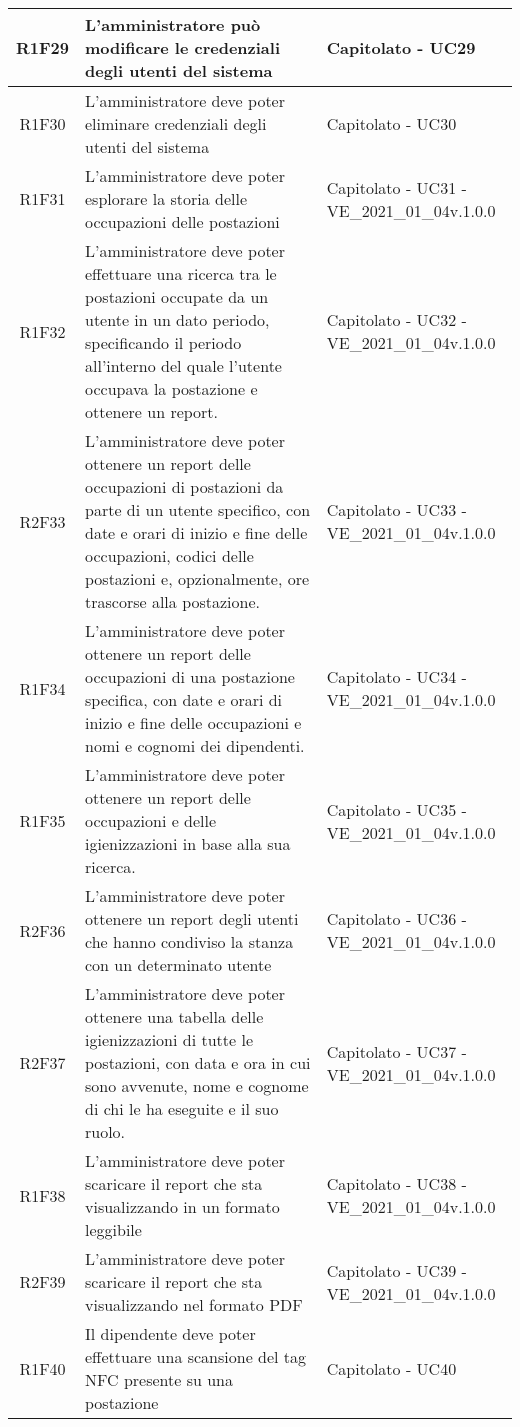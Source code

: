 \begin{center}
\begin{longtable}{|c|p{10cm}|p{4cm}|}
		\hline
		R1F29&L'amministratore può modificare le credenziali degli utenti del sistema	&Capitolato - UC29	\\
		\hline
		R1F30&L'amministratore deve poter eliminare credenziali degli utenti del sistema	& Capitolato - UC30	\\
		\hline	
		R1F31&L'amministratore deve poter esplorare la storia delle occupazioni delle postazioni	& Capitolato - UC31 - VE\_2021\_01\_04v.1.0.0	\\
		\hline
		R1F32&L'amministratore deve poter effettuare una ricerca tra le postazioni occupate da un utente in un dato periodo, specificando il periodo all'interno del quale l'utente occupava la postazione e ottenere un report. & 	Capitolato - UC32 - VE\_2021\_01\_04v.1.0.0\\
		\hline
		R2F33&L'amministratore deve poter ottenere un report delle occupazioni di postazioni da parte di un utente specifico, con date e orari di inizio e fine delle occupazioni,  codici delle postazioni e, opzionalmente, ore trascorse alla postazione. & 	Capitolato - UC33 - VE\_2021\_01\_04v.1.0.0\\
		\hline
		R1F34&L'amministratore deve poter ottenere un report delle occupazioni di una postazione specifica, con date e orari di inizio e fine delle occupazioni e nomi e cognomi dei dipendenti.	&Capitolato - UC34 - VE\_2021\_01\_04v.1.0.0	\\
		\hline
		R1F35&L'amministratore deve poter ottenere un report delle occupazioni e delle igienizzazioni in base alla sua ricerca.	&Capitolato - UC35 - VE\_2021\_01\_04v.1.0.0	\\
		\hline
		R2F36 & L'amministratore deve poter ottenere un report degli utenti che hanno condiviso la stanza con un determinato utente & Capitolato - UC36 - VE\_2021\_01\_04v.1.0.0\\
		\hline
		R2F37&L'amministratore deve poter ottenere una tabella delle igienizzazioni di tutte le postazioni, con data e ora in cui sono avvenute, nome e cognome di chi le ha eseguite e il suo ruolo.	&Capitolato - UC37 - VE\_2021\_01\_04v.1.0.0	\\
		\hline
		R1F38 & L'amministratore deve poter scaricare il report che sta visualizzando in un formato leggibile & Capitolato - UC38 - VE\_2021\_01\_04v.1.0.0\\
		\hline	
		R2F39 & L'amministratore deve poter scaricare il report che sta visualizzando nel formato PDF & Capitolato - UC39 - VE\_2021\_01\_04v.1.0.0\\
		\hline		 
		R1F40 & Il dipendente deve poter effettuare una scansione del tag NFC presente su una postazione & Capitolato - UC40 \\

\end{longtable}
\end{center}
